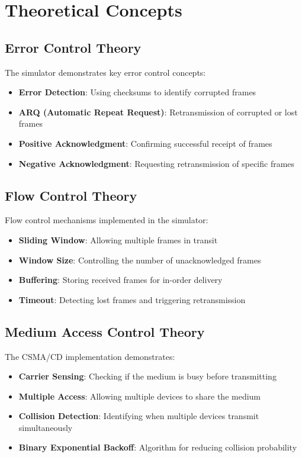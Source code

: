 \documentclass[12pt,a4paper]{article}
\begin{document}
\section{Theoretical Concepts}
\subsection{Error Control Theory}
The simulator demonstrates key error control concepts:
\begin{itemize}
    \item \textbf{Error Detection}: Using checksums to identify corrupted frames
    \item \textbf{ARQ (Automatic Repeat Request)}: Retransmission of corrupted or lost frames
    \item \textbf{Positive Acknowledgment}: Confirming successful receipt of frames
    \item \textbf{Negative Acknowledgment}: Requesting retransmission of specific frames
\end{itemize}

\subsection{Flow Control Theory}
Flow control mechanisms implemented in the simulator:
\begin{itemize}
    \item \textbf{Sliding Window}: Allowing multiple frames in transit
    \item \textbf{Window Size}: Controlling the number of unacknowledged frames
    \item \textbf{Buffering}: Storing received frames for in-order delivery
    \item \textbf{Timeout}: Detecting lost frames and triggering retransmission
\end{itemize}

\subsection{Medium Access Control Theory}
The CSMA/CD implementation demonstrates:
\begin{itemize}
    \item \textbf{Carrier Sensing}: Checking if the medium is busy before transmitting
    \item \textbf{Multiple Access}: Allowing multiple devices to share the medium
    \item \textbf{Collision Detection}: Identifying when multiple devices transmit simultaneously
    \item \textbf{Binary Exponential Backoff}: Algorithm for reducing collision probability
\end{itemize}
\end{document}
